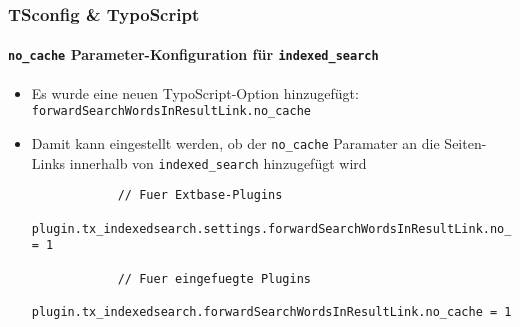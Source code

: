 \begin{frame}[fragile]
	\frametitle{TSconfig \& TypoScript}
	\framesubtitle{\texttt{no\_cache} Parameter-Konfiguration für \texttt{indexed\_search}}

	\lstset{basicstyle=\tiny\ttfamily}

	\begin{itemize}

		\item Es wurde eine neuen TypoScript-Option hinzugefügt:\newline
			 \texttt{forwardSearchWordsInResultLink.no\_cache}

		\item Damit kann eingestellt werden, ob der \texttt{no\_cache} Paramater an die Seiten-Links
			innerhalb von \texttt{indexed\_search} hinzugefügt wird

		\begin{lstlisting}
			// Fuer Extbase-Plugins
			plugin.tx_indexedsearch.settings.forwardSearchWordsInResultLink.no_cache = 1

			// Fuer eingefuegte Plugins
			plugin.tx_indexedsearch.forwardSearchWordsInResultLink.no_cache = 1
		\end{lstlisting}

	\end{itemize}

\end{frame}

